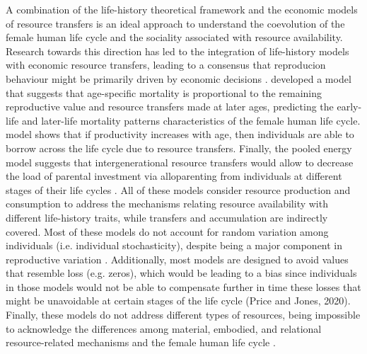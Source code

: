 \documentclass{article}
\begin{document}
A combination of the life-history theoretical framework and the economic models of resource transfers is an ideal approach to understand the coevolution of the female human life cycle and the sociality associated with resource availability. Research towards this direction has led to the integration of life-history models with economic resource transfers, leading to a consensus that reproducion behaviour might be primarily driven by economic decisions \citep{jones2015resource}. \cite{lee2003rethinking} developed a model that suggests that age-specific mortality is proportional to the remaining reproductive value and resource transfers made at later ages, predicting the early-life and later-life mortality patterns characteristics of the female human life cycle. \cite{chu2006co} model shows that if productivity increases with age, then individuals are able to borrow across the life cycle due to resource transfers. Finally, the pooled energy model suggests that intergenerational resource transfers would allow to decrease the load of parental investment via alloparenting from individuals at different stages of their life cycles \citep{kramer2010pooled}. All of these models consider resource production and consumption to address the mechanisms relating resource availability with different life-history traits, while transfers and accumulation are indirectly covered. Most of these models do not account for random variation among individuals (i.e. individual stochasticity), despite being a major component in reproductive variation \citep{van2017lifetime}. Additionally, most models are designed to avoid values that resemble loss (e.g. zeros), which would be leading to a bias since individuals in those models would not be able to compensate further in time these losses that might be unavoidable at certain stages of the life cycle (Price and Jones, 2020). Finally, these models do not address different types of resources, being impossible to acknowledge the differences among material, embodied, and relational resource-related mechanisms and the female human life cycle \citep{mulder2009intergenerational}.
\\\\
\end{document}
